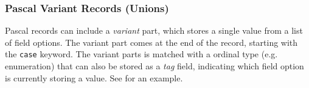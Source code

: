 \clearpage

\subsubsection{Pascal Variant Records (Unions)} %
\label{ssub:pascal_variant_records_unions_}

Pascal records can include a \emph{variant} part, which stores a single value from a list of field options. The variant part comes at the end of the record, starting with the \texttt{case} keyword. The variant parts is matched with a ordinal type (e.g. enumeration) that can also be stored as a \emph{tag} field, indicating which field option is currently storing a value. See  for an example.

\begin{figure}[h]
\end{figure}


